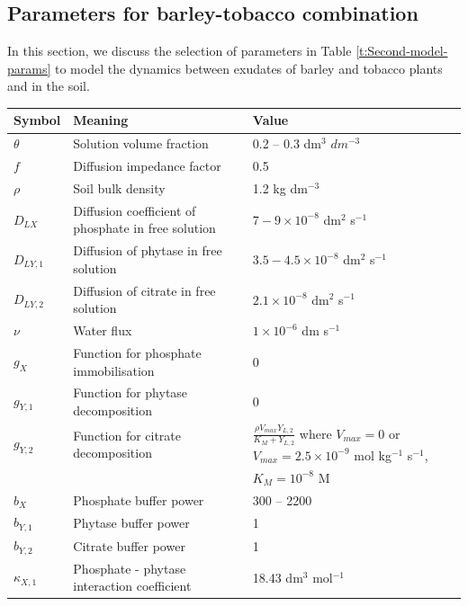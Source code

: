 \documentclass[11pt]{article}
\numberwithin{equation}{section}
\begin{document}
\subsection{Parameters for barley-tobacco combination}
In this section, we discuss the selection of parameters in Table \ref{t:Second-model-params} to model the dynamics between exudates of barley and tobacco plants and  in the soil.

\begin{table}[!htb]
\begin{center}
\fontsize{9.5}{7}\selectfont
\setlength{\tabcolsep}{5.pt}
\def\arraystretch{1.5}
\begin{tabular}{lll}
\toprule
    \bf Symbol & \multicolumn{1}{l}{\bf Meaning} & \bf Value
    \\ \midrule
    $\theta$ & Solution volume fraction & 0.2 -- 0.3 dm$^3$ $dm^{-3}$ \\
    $f$ & Diffusion impedance factor & 0.5 \\ 
    $\rho$ & Soil bulk density & 1.2 kg dm$^{-3}$ \\
    $D_{LX} $ & Diffusion coefficient of phosphate in free solution & $7-9 \times 10^{-8}$ dm$^2$ s$^{-1}$ \\  
	$D_{LY,1}$ &  Diffusion of phytase in free solution & $3.5 - 4.5 \times 10^{-8}$ dm$^2$ s$^{-1}$ \\   
	$D_{LY,2}$ & Diffusion of citrate in free solution & $2.1 \times 10^{-8}$ dm$^2$ s$^{-1}$ \\
	$\nu$ & Water flux & $1 \times 10^{-6}$ dm s$^{-1}$\\
	$g_X$ & Function for phosphate immobilisation & 0 \\
	$g_{Y,1}$ & Function for phytase decomposition & 0 \\
	$g_{Y,2}$ & Function for citrate decomposition & $\frac{\rho V_{max} Y_{L,2} }{K_M + Y_{L,2} }$ where $V_{max} = 0$ or $V_{max} = 2.5 \times 10^{-9}$ mol kg$^{-1}$ s$^{-1}$, \\
	 & & $K_M=10^{-8}$ M \\
	$b_X$ & Phosphate buffer power & 300 -- 2200 \\
	$b_{Y,1}$ & Phytase buffer power & 1 \\
	$b_{Y,2}$ & Citrate buffer power & 1 \\
	$\kappa_{X,1}$ & Phosphate - phytase interaction coefficient & 18.43 dm$^3$ mol$^{-1}$ \\

\end{tabular}
\end{center}
\end{table}
\end{document}
